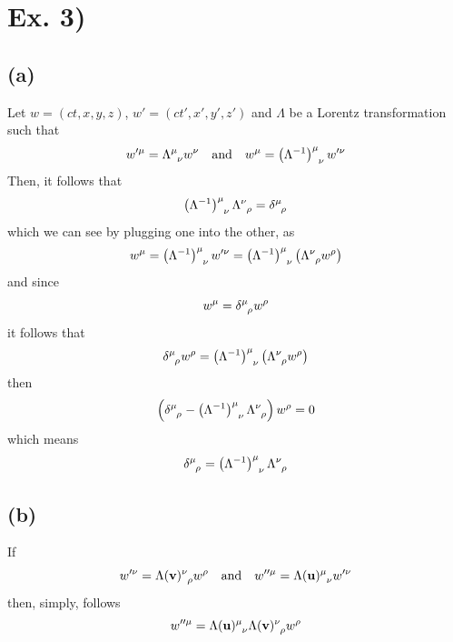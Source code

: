 \documentclass[oneside, 10pt, notitlepage]{book}
\begin{document}
\section*{Ex. 3)}
\subsection*{(a)}
Let \(w = (ct,x,y,z)\), \(w'=(ct',x', y',z')\) and \(\Lambda\) be a Lorentz transformation such that
\begin{equation}
   w'^{\mu}=\tensor{\Lambda}{^{\mu}_{\nu}}  w^{\nu} \qq{and} w^{\mu}=\tensor{\lr{\Lambda^{-1}}}{^{\mu}_{\nu}}w'^{\nu}
\end{equation}
Then, it follows that
\begin{equation}
    \tensor{\lr{\Lambda^{-1}}}{^{\mu}_{\nu}}\tensor{\Lambda}{^{\nu}_{\rho}} = \tensor{\delta}{^{\mu}_{\rho}}
\end{equation}
which we can see by plugging one into the other, as
\begin{equation}
    w^{\mu}=\tensor{\lr{\Lambda^{-1}}}{^{\mu}_{\nu}}w'^{\nu}=\tensor{\lr{\Lambda^{-1}}}{^{\mu}_{\nu}}\lr{\tensor{\Lambda}{^{\nu}_{\rho}}  w^{\rho}}
\end{equation}
and since
\begin{equation}
    w^{\mu}=\tensor{\delta}{^{\mu}_{\rho}}w^{\rho}
\end{equation}
it follows that
\begin{equation}
    \tensor{\delta}{^{\mu}_{\rho}}w^{\rho} = \tensor{\lr{\Lambda^{-1}}}{^{\mu}_{\nu}}\lr{\tensor{\Lambda}{^{\nu}_{\rho}}  w^{\rho}}
\end{equation}
then
\begin{equation}
    \lr{\tensor{\delta}{^{\mu}_{\rho}} -  \tensor{\lr{\Lambda^{-1}}}{^{\mu}_{\nu}}\tensor{\Lambda}{^{\nu}_{\rho}}}w^{\rho} = 0
\end{equation}
which means
\begin{equation}
    \tensor{\delta}{^{\mu}_{\rho}} = \tensor{\lr{\Lambda^{-1}}}{^{\mu}_{\nu}}\tensor{\Lambda}{^{\nu}_{\rho}}
\end{equation}

\subsection*{(b)}

If
\begin{equation}
    w'^{\nu} = \tensor{\Lambda(\vb{v})}{^{\nu}_{\rho}}w^{\rho} \qq{and} w''^{\mu} = \tensor{\Lambda(\vb{u})}{^{\mu}_{\nu}}w'^{\nu}
\end{equation}
then, simply, follows
\begin{equation}
    w''^{\mu} = \tensor{\Lambda(\vb{u})}{^{\mu}_{\nu}}\tensor{\Lambda(\vb{v})}{^{\nu}_{\rho}}w^{\rho}
\end{equation}
\end{document}
